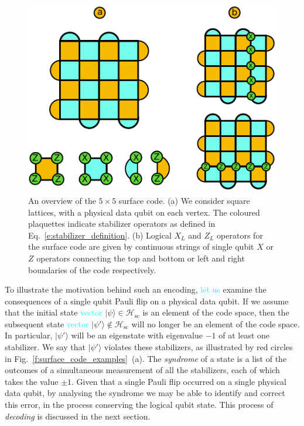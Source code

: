 \documentclass[twocolumn,preprintnumbers,amsmath,amssymb,notitlepage,nofootinbib,longbibliography,superscriptaddress,aps,pra,10pt]{revtex4-1}
\newcommand{\je}[1]{\textcolor{cyan}{#1}}
\begin{document}
	\begin{figure}
		\centering
		\includegraphics[width=0.8\linewidth]{figures/surface_code.pdf}
		\caption{
			An overview of the $5 \times 5$ surface code.
			(a) We consider square lattices, with a physical data qubit on each vertex.
			The coloured plaquettes indicate stabilizer operators as defined in Eq.~\eqref{e:stabilizer_definition}.
			(b) Logical $X_L$ and $Z_L$ operators for the surface code are given by continuous strings of single qubit $X$ or $Z$ operators connecting the top and bottom or left and right boundaries of the code respectively.
		}
		\label{f:surface_code}
	\end{figure}

	To illustrate the motivation behind such an encoding, \je{let us} examine the consequences of a single qubit Pauli flip on a physical data qubit.
	If we assume that the initial state \je{vector} $|\psi\rangle \in \mathcal{H}_\mathrm{sc}$ is an element of the code space, then the subsequent state
	\je{vector} $|\psi'\rangle \not \in \mathcal{H}_\mathrm{sc}$ will no longer be an element of the code space.
	In particular, $|\psi'\rangle$ will be an eigenstate with eigenvalue $-1$ of at least one stabilizer.
	We say that $|\psi'\rangle$ violates these stabilizers, as illustrated by red circles in Fig.~\ref{f:surface_code_examples}~(a).
	The \textit{syndrome} of a state is a list of the outcomes of a simultaneous measurement of all the stabilizers, each of which takes the value $\pm 1$.
	Given that a single Pauli flip occurred on a single physical data qubit, by analysing the syndrome we may be able to identify and correct this error, in the process conserving the logical qubit state. 	This process of \textit{decoding} is discussed in the next section.
\end{document}
